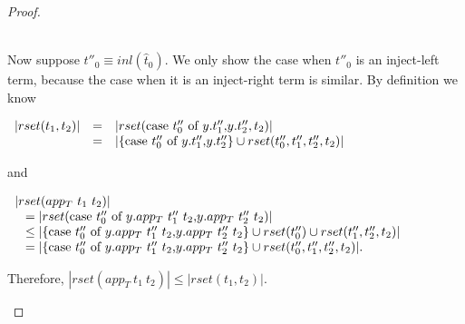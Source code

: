 \begin{proof}
\begin{itemize}
\begin{itemize}
    \ \\
    Now suppose $t''_0 \equiv inl(\hat{t}_0)$.  We only show the case when $t''_0$ is an
    inject-left term, because the case when it is an inject-right term is similar.  By
    definition we know 
    \begin{center}
      \begin{math}
        \begin{array}{lll}
          |rset(t_1,t_2)| & = & |rset(\mbox{case}\ t''_0\ \text{of}\ y\text{.}t''_1\text{,}y\text{.}t''_2, t_2)|\\
          & = & |\{\mbox{case}\ t''_0\ \text{of}\ y\text{.}t''_1\text{,}y\text{.}t''_2\} \cup rset(t''_0,t''_1,t''_2,t_2)|
        \end{array}
      \end{math}
    \end{center}
    and 
    \begin{center}
      \small
      \begin{math}
        \begin{array}{lll}
          |rset(app_T\ t_1\ t_2)| \\
          \,\,\,\,\,= |rset(\mbox{case}\ t''_0\ \text{of}\ y\text{.}app_T\ t''_1\ t_2\text{,}y\text{.}app_T\ t''_2\ t_2)|\\
          \,\,\,\,\,\leq |\{\mbox{case}\ t''_0\ \text{of}\ y\text{.}app_T\ t''_1\ t_2\text{,}y\text{.}app_T\ t''_2\ t_2\} \cup rset(t''_0) \cup rset(t''_1, t''_2, t_2)|\\
          \,\,\,\,\,= |\{\mbox{case}\ t''_0\ \text{of}\ y\text{.}app_T\ t''_1\ t_2\text{,}y\text{.}app_T\ t''_2\ t_2\} \cup rset(t''_0, t''_1, t''_2, t_2)|.
        \end{array}
      \end{math}
    \end{center}
    Therefore, $|rset(app_T\ t_1\ t_2)| \leq |rset(t_1,t_2)|$.
  \end{itemize}


\end{itemize}
\end{proof}

